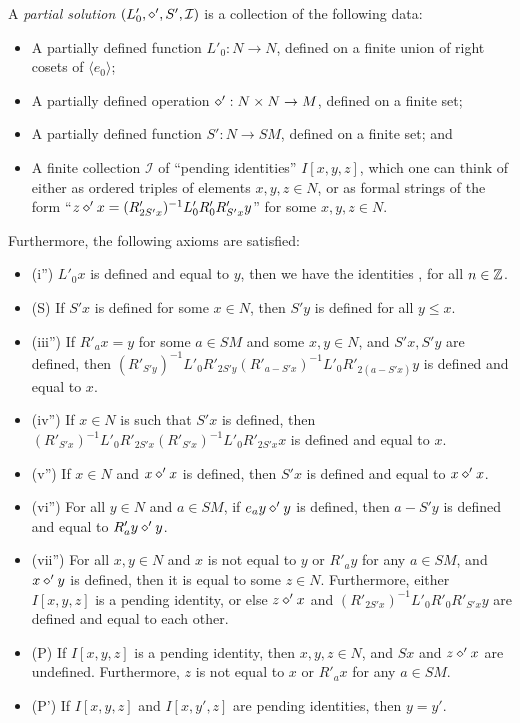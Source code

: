 \begin{definition}\label{part-sol}\leanok  A \emph{partial solution} $(L'_0, \diamond', S', {\mathcal I})$ is a collection of the following data:
\begin{itemize}
  \item A partially defined function $L'_0: N \to N$, defined on a finite union of right cosets of $\langle e_0\rangle$;
  \item A partially defined operation $\diamond': N \times N \to M$, defined on a finite set;
  \item A partially defined function $S': N \to SM$, defined on a finite set; and
  \item A finite collection ${\mathcal  I}$ of ``pending identities'' $I[x,y,z]$, which one can think of either as ordered triples of elements $x,y,z \in N$, or as formal strings of the form ``$z \diamond' x = (R'_{2S'x})^{-1} L'_0 R'_0 R'_{S'x} y$'' for some $x,y,z \in N$.
\end{itemize}

Furthermore, the following axioms are satisfied:
\begin{itemize}
  \item (i'')  $L'_0 x$ is defined and equal to $y$, then we have the identities ,  for all $n\in \mathbb{Z}$.
  \item (S) If $S'x$ is defined for some $x \in N$, then $S'y$ is defined for all $y \leq x$.
  \item (iii'') If $R'_a x = y$ for some $a \in SM$ and some $x,y \in N$, and $S'x, S'y$ are defined, then $(R'_{S'y})^{-1} L'_0 R'_{2S'y} (R'_{a-S'x})^{-1} L'_0 R'_{2(a-S'x)} y$ is defined and equal to $x$.
  \item (iv'') If $x \in N$ is such that $S'x$ is defined, then $(R'_{S'x})^{-1} L'_0 R'_{2S'x} (R'_{S'x})^{-1} L'_0 R'_{2S'x} x$ is defined and equal to $x$.
  \item (v'')  If $x \in N$ and $x \diamond' x$ is defined, then $S'x$ is defined and equal to $x \diamond' x$.
  \item (vi'')  For all $y \in N$ and $a \in SM$, if $e_a y \diamond' y$ is defined, then $a - S'y$ is defined and equal to $R'_a y \diamond' y$.
  \item (vii'')  For all $x,y \in N$ and $x$ is not equal to $y$ or $R'_a y$ for any $a \in SM$, and $x \diamond' y$ is defined, then it is equal to some $z \in N$.  Furthermore, either $I[x,y,z]$ is a pending identity, or else $z \diamond' x$ and $(R'_{2S'x})^{-1} L'_0 R'_0 R'_{S'x} y$ are defined and equal to each other.
  \item (P) If $I[x,y,z]$ is a pending identity, then $x,y,z \in N$, and $Sx$ and $z \diamond' x$ are undefined.  Furthermore, $z$ is not equal to $x$ or $R'_a x$ for any $a \in SM$.
  \item (P') If $I[x,y,z]$ and $I[x,y',z]$ are pending identities, then $y=y'$.
\end{itemize}


\end{definition}
